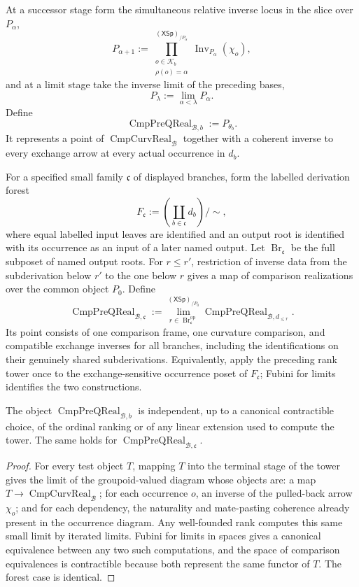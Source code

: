 \begin{definition}
At a successor stage form the simultaneous relative inverse locus in the slice
over $P_\alpha$,
\[
P_{\alpha+1}
:=
\prod_{\substack{o\in\mathcal K_b\\\rho(o)=\alpha}}^{(\mathsf{XSp})_{/P_\alpha}}
\operatorname{Inv}_{P_\alpha}(\chi_o),
\]
and at a limit stage take the inverse limit of the preceding bases,
\[
P_\lambda:=\lim_{\alpha<\lambda}P_\alpha.
\]
Define
\[
\boxed{
\operatorname{CmpPreQReal}_{\mathcal B,b}
:=
P_{\theta_b}.
}
\]
It represents a point of
$\operatorname{CmpCurvReal}_{\mathcal B}$ together with a coherent inverse to
every exchange arrow at every actual occurrence in $d_b$.

For a specified small family $\mathfrak c$ of displayed branches, form the
labelled derivation forest
\[
F_{\mathfrak c}:=
\left(\coprod_{b\in\mathfrak c}d_b\right)\!\big/\!\sim,
\]
where equal labelled input leaves are identified and an output root is identified
with its occurrence as an input of a later named output.  Let
$\operatorname{Br}_{\mathfrak c}$ be the full subposet of named output roots.
For $r\leq r'$, restriction of inverse data from the subderivation below $r'$ to
the one below $r$ gives a map of comparison realizations over the common object
$P_0$.  Define
\[
\boxed{
\operatorname{CmpPreQReal}_{\mathcal B,\mathfrak c}
:=
\lim_{r\in\operatorname{Br}_{\mathfrak c}^{\mathrm{op}}}^{(\mathsf{XSp})_{/P_0}}
\operatorname{CmpPreQReal}_{\mathcal B,d_{\leq r}}.
}
\]
Its point consists of one comparison frame, one curvature comparison, and
compatible exchange inverses for all branches, including the identifications on
their genuinely shared subderivations.  Equivalently, apply the preceding rank
tower once to the exchange-sensitive occurrence poset of $F_{\mathfrak c}$;
Fubini for limits identifies the two constructions.
\end{definition}

\begin{proposition}
\label{prop:prequantum-comparison-rank-independence}
The object $\operatorname{CmpPreQReal}_{\mathcal B,b}$ is independent, up to a
canonical contractible choice, of the ordinal ranking or of any linear extension
used to compute the tower.  The same holds for
$\operatorname{CmpPreQReal}_{\mathcal B,\mathfrak c}$.
\end{proposition}

\begin{proof}
For every test object $T$, mapping $T$ into the terminal stage of the tower gives
the limit of the groupoid-valued diagram whose objects are: a map
$T\to\operatorname{CmpCurvReal}_{\mathcal B}$; for each occurrence $o$, an
inverse of the pulled-back arrow $\chi_o$; and for each dependency, the
naturality and mate-pasting coherence already present in the occurrence
diagram.  Any well-founded rank computes this same small limit by iterated
limits.  Fubini for limits in spaces gives a canonical equivalence between any
two such computations, and the space of comparison equivalences is contractible
because both represent the same functor of $T$.  The forest case is identical.
\end{proof}

